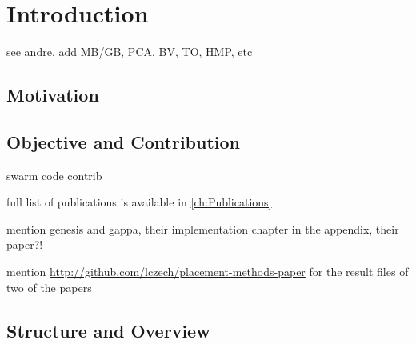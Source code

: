 
\chapter{Introduction}
\label{ch:Introduction}


 see andre, add MB/GB, PCA,
BV, TO, HMP, etc


\section{Motivation}
\label{ch:Introduction:sec:Motivation}


\section{Objective and Contribution}
\label{ch:Introduction:sec:ObjectiveContribution}

swarm code contrib \cite{Mahe2014,Mahe2015}

full list of publications is available in \ref{ch:Publications}

mention genesis and gappa, their implementation chapter in the appendix,
their paper?!

mention  \url{http://github.com/lczech/placement-methods-paper} for the result files of two of the papers


\section{Structure and Overview}
\label{ch:Introduction:sec:StructureOverview}

